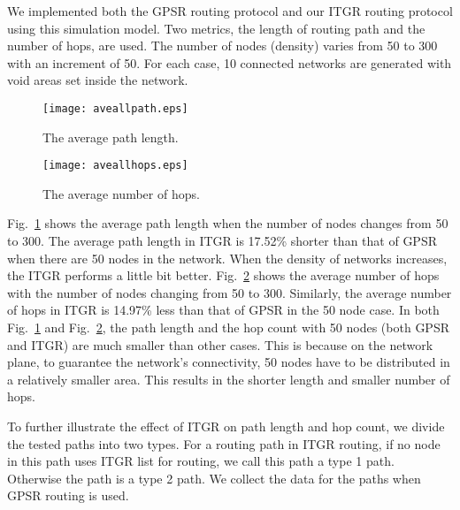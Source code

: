 \documentclass[3p,times]{elsarticle}
\begin{document}
We implemented both the GPSR routing protocol and our ITGR routing protocol using this simulation model.
Two metrics, the length of routing path and the number of hops, are used.
The number of nodes (density) varies from 50 to 300
with an increment of 50. For each case,
10 connected networks are generated with void areas set
inside the network.



\begin{figure}[hb]
\begin{center}
\texttt{[image: aveallpath.eps]}
\end{center}
\caption{The average path length.}
\label{fig15}
\end{figure}


\begin{figure}
\begin{center}
\texttt{[image: aveallhops.eps]}
\end{center}
\caption{The average number of hops.}
\label{fig16}
\end{figure}


Fig.~\ref{fig15} shows the average path length when the number of nodes changes from 50 to 300.
The average path length in ITGR is 17.52\% shorter than that of GPSR when there are 50 nodes
in the network.
When the density of networks increases, the ITGR performs a little bit better.
Fig.~\ref{fig16} shows the average number of hops with the number of nodes changing
from 50 to 300.
Similarly, the average number of hops in ITGR is 14.97\% less than that of GPSR
in the 50 node case.
In both Fig.~\ref{fig15} and Fig.~\ref{fig16}, the path length and the hop count
with 50 nodes (both GPSR and ITGR) are much smaller than other cases.
This is because on the network plane, to guarantee the network's connectivity, 50 nodes have to be
distributed in a relatively smaller area. This results in the shorter length and smaller number
of hops.


To further illustrate the effect of ITGR on path length and hop count, we divide the tested paths into two types. For a
routing path in ITGR routing, if no node in this path uses ITGR list for routing,
we call this path a type 1 path. Otherwise the path is a type 2 path.
We collect the data for the paths when GPSR routing is used.
\end{document}
